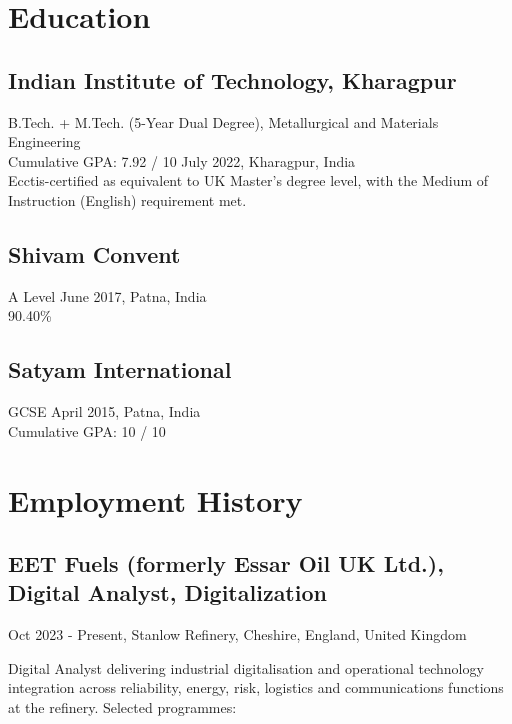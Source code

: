 \documentclass[11pt,a4paper]{article}
\begin{document}
\section*{Education}

\subsection*{Indian Institute of Technology, Kharagpur}
B.Tech. + M.Tech. (5-Year Dual Degree), Metallurgical and Materials Engineering \\
Cumulative GPA: 7.92 / 10 \hfill July 2022, Kharagpur, India \\
Ecctis-certified as equivalent to UK Master's degree level, with the Medium
of Instruction (English) requirement met.

\subsection*{Shivam Convent}
A Level \hfill June 2017, Patna, India \\
90.40\%

\subsection*{Satyam International}
GCSE \hfill April 2015, Patna, India \\
Cumulative GPA: 10 / 10

\section*{Employment History}

\subsection*{EET Fuels (formerly Essar Oil UK Ltd.), Digital Analyst, Digitalization}
Oct 2023 - Present, Stanlow Refinery, Cheshire, England, United Kingdom

Digital Analyst delivering industrial digitalisation and operational
technology integration across reliability, energy, risk, logistics and
communications functions at the refinery. Selected programmes:
\end{document}
